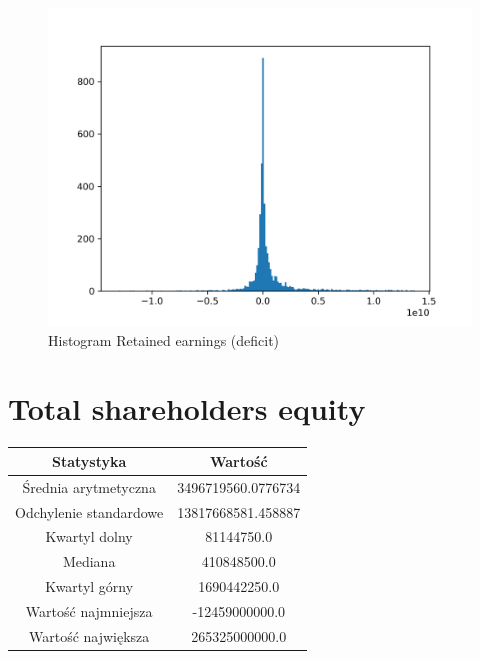 \documentclass{article}
\begin{document}
\begin{figure}[h!]
    \includegraphics[width=\linewidth]{variables/Retained earnings (deficit).png}
    \caption{Histogram Retained earnings (deficit) }
\end{figure}\section{ Total shareholders equity }

\begin{center}
    \begin{tabular}{|c | c|} 
    \hline
    Statystyka & Wartość \\
    \hline\hline
    Średnia arytmetyczna & 3496719560.0776734 \\ 
    \hline
    Odchylenie standardowe & 13817668581.458887 \\
    \hline
    Kwartyl dolny & 81144750.0 \\
    \hline
    Mediana & 410848500.0 \\
    \hline
    Kwartyl górny & 1690442250.0 \\
    \hline
    Wartość najmniejsza & -12459000000.0 \\
    \hline
    Wartość największa & 265325000000.0 \\
    \hline
   \end{tabular}
\end{center}
\end{document}
